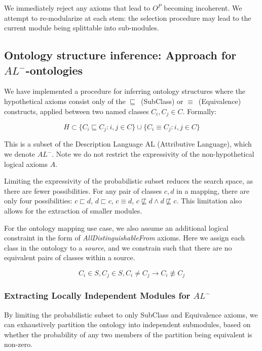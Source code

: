 \documentclass{my}
\begin{document}
We immediately reject any axioms that lead to $O^P$ becoming
incoherent.
We attempt to re-modularize at each stem: the selection procedure may
lead to the current module being splittable into sub-modules.

\subsection{Ontology structure inference: Approach for $AL^{-}$-ontologies}

We have implemented a procedure for inferring ontology structures
where the hypothetical axioms consist only of the
$\sqsubseteq$\ (SubClass) or $\equiv$\ (Equivalence) constructs,
applied between two named classes $C_i, C_j \in C$. Formally:

\begin{equation}
H \subset \{  C_i \sqsubseteq C_j : i,j \in C \} \cup \{  C_i \equiv C_j : i,j \in C \}
\end{equation}

This is a subset of the Description Language AL (Attributive
Language), which we denote $AL^{-}$. Note we do not restrict the expressivity of
the non-hypothetical logical axioms $A$.

Limiting the expressivity of the probabilistic subset reduces the
search space, as there are fewer possibilities. For any pair of
classes $c,d$ in a mapping, there are only four possibilities: $c \sqsubset d$, $d \sqsubset c$, $c \equiv d$, $c \not\sqsubseteq d \wedge d \not\sqsubseteq c $. This
limitation also allows for the extraction of smaller modules.

For the ontology mapping use case, we also assume an additional
logical constraint in the form of \emph{AllDistinguishableFrom}
axioms. Here we assign each class in the ontology to a \emph{source},
and we constrain such that there are no equivalent pairs of classes
within a source.

\begin{equation}
C_i \in S, C_j \in S, C_i \neq C_j \to C_i \not\equiv C_j
\end{equation}

\subsubsection{Extracting Locally Independent Modules for $AL^{-}$}

By limiting the probabilistic subset to only SubClass and Equivalence
axioms, we can exhaustively partition the ontology into independent
submodules, based on whether the probability of any two members of the
partition being equivalent is non-zero.
\end{document}
